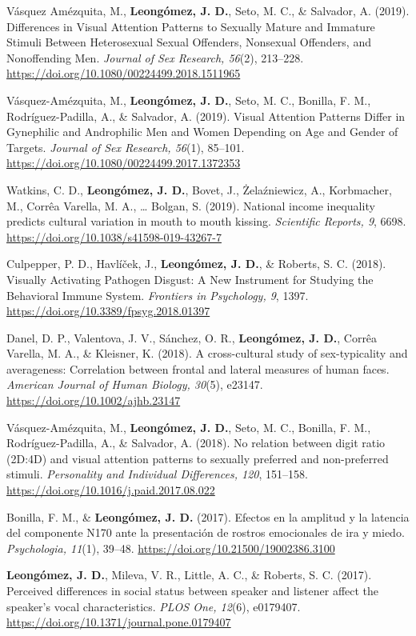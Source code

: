 \documentclass[11pt,a4paper,]{awesome-cv}
\begin{document}
Vásquez Amézquita, M., \textbf{Leongómez, J. D.}, Seto, M. C., \&
Salvador, A. (2019). Differences in Visual Attention Patterns to
Sexually Mature and Immature Stimuli Between Heterosexual Sexual
Offenders, Nonsexual Offenders, and Nonoffending Men. \emph{Journal of
Sex Research, 56}(2), 213--228.
\url{https://doi.org/10.1080/00224499.2018.1511965}

Vásquez-Amézquita, M., \textbf{Leongómez, J. D.}, Seto, M. C., Bonilla,
F. M., Rodríguez-Padilla, A., \& Salvador, A. (2019). Visual Attention
Patterns Differ in Gynephilic and Androphilic Men and Women Depending on
Age and Gender of Targets. \emph{Journal of Sex Research, 56}(1),
85--101. \url{https://doi.org/10.1080/00224499.2017.1372353}

Watkins, C. D., \textbf{Leongómez, J. D.}, Bovet, J., Żelaźniewicz, A.,
Korbmacher, M., Corrêa Varella, M. A., \ldots{} Bolgan, S. (2019).
National income inequality predicts cultural variation in mouth to mouth
kissing. \emph{Scientific Reports, 9}, 6698.
\url{https://doi.org/10.1038/s41598-019-43267-7}

Culpepper, P. D., Havlíček, J., \textbf{Leongómez, J. D.}, \& Roberts,
S. C. (2018). Visually Activating Pathogen Disgust: A New Instrument for
Studying the Behavioral Immune System. \emph{Frontiers in Psychology,
9}, 1397. \url{https://doi.org/10.3389/fpsyg.2018.01397}

Danel, D. P., Valentova, J. V., Sánchez, O. R.,
\textbf{Leongómez, J. D.}, Corrêa Varella, M. A., \& Kleisner, K.
(2018). A cross-cultural study of sex-typicality and averageness:
Correlation between frontal and lateral measures of human faces.
\emph{American Journal of Human Biology, 30}(5), e23147.
\url{https://doi.org/10.1002/ajhb.23147}

Vásquez-Amézquita, M., \textbf{Leongómez, J. D.}, Seto, M. C., Bonilla,
F. M., Rodríguez-Padilla, A., \& Salvador, A. (2018). No relation
between digit ratio (2D:4D) and visual attention patterns to sexually
preferred and non-preferred stimuli. \emph{Personality and Individual
Differences, 120}, 151--158.
\url{https://doi.org/10.1016/j.paid.2017.08.022}

Bonilla, F. M., \& \textbf{Leongómez, J. D.} (2017). Efectos en la
amplitud y la latencia del componente N170 ante la presentación de
rostros emocionales de ira y miedo. \emph{Psychologia, 11}(1), 39--48.
\url{https://doi.org/10.21500/19002386.3100}

\textbf{Leongómez, J. D.}, Mileva, V. R., Little, A. C., \& Roberts, S.
C. (2017). Perceived differences in social status between speaker and
listener affect the speaker's vocal characteristics. \emph{PLOS One,
12}(6), e0179407. \url{https://doi.org/10.1371/journal.pone.0179407}
\end{document}
